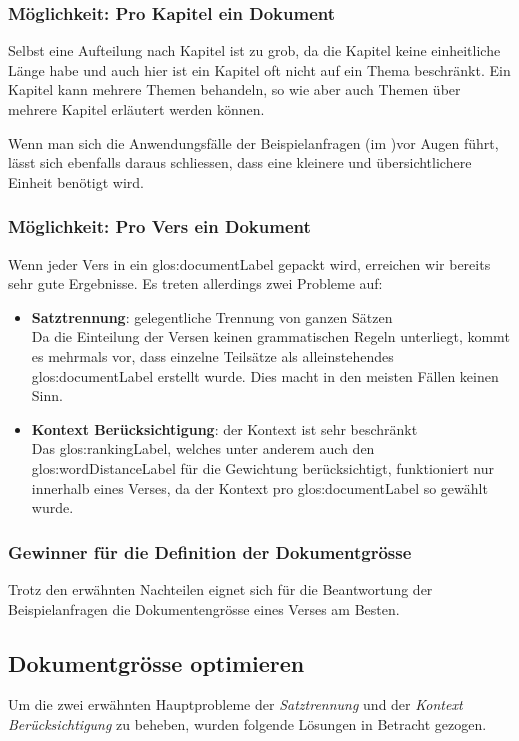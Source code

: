 \subsubsection{Möglichkeit: Pro Kapitel ein Dokument}
Selbst eine Aufteilung nach Kapitel ist zu grob, da die Kapitel keine einheitliche Länge habe und auch hier ist ein Kapitel oft nicht auf ein Thema beschränkt.
Ein Kapitel kann mehrere Themen behandeln, so wie aber auch Themen über mehrere Kapitel erläutert werden können.

Wenn man sich die Anwendungsfälle der Beispielanfragen (im )vor Augen führt, lässt sich ebenfalls daraus schliessen, dass eine kleinere und übersichtlichere Einheit benötigt wird.

\subsubsection{Möglichkeit: Pro Vers ein Dokument}
Wenn jeder Vers in ein \gls{glos:documentLabel} gepackt wird, erreichen wir bereits sehr gute Ergebnisse.
Es treten allerdings zwei Probleme auf:
\begin{itemize}
	\item \textbf{Satztrennung}: gelegentliche Trennung von ganzen Sätzen\\
	Da die Einteilung der Versen keinen grammatischen Regeln unterliegt, kommt es mehrmals vor, dass einzelne Teilsätze als alleinstehendes \gls{glos:documentLabel} erstellt wurde. Dies macht in den meisten Fällen keinen Sinn.
	\item \textbf{Kontext Berücksichtigung}: der Kontext ist sehr beschränkt\\
	Das \gls{glos:rankingLabel}, welches unter anderem auch den \gls{glos:wordDistanceLabel} für die Gewichtung berücksichtigt, funktioniert nur innerhalb eines Verses, da der Kontext pro \gls{glos:documentLabel} so gewählt wurde.
\end{itemize}

\subsubsection{Gewinner für die Definition der Dokumentgrösse}
Trotz den erwähnten Nachteilen eignet sich für die Beantwortung der Beispielanfragen die Dokumentengrösse eines Verses am Besten.


\subsection{Dokumentgrösse optimieren}
Um die zwei erwähnten Hauptprobleme der \textit{Satztrennung} und der \textit{Kontext Berücksichtigung} zu beheben, wurden folgende Lösungen in Betracht gezogen.

